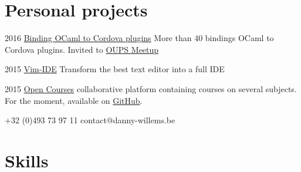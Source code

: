 \documentclass[fontsize=10pt]{tccv}
\begin{document}
\section{Personal projects}

\begin{yearlist}

\item{2016}
     {\href{https://github.com/dannywillems/ocaml-cordova-plugin-list}{Binding
      OCaml to Cordova plugins}}
     {More than 40 bindings OCaml to Cordova plugins. Invited to
       \href{http://www.meetup.com/fr-FR/ocaml-paris/}{OUPS Meetup}}


\item{2015}
     {\href{http://github.com/vim-ide/vim-ide/}{Vim-IDE}}
     {Transform the best text editor into a full IDE}

\item{2015}
     {\href{https://github.com/open-courses}{Open Courses}}
     {collaborative platform containing courses on several subjects. For the
     moment, available on \href{https://github.com/open-courses}{GitHub}}.



\end{yearlist}

    {+32 (0)493 73 97 11}
    {contact@danny-willems.be}

\section{Skills}
\end{document}
